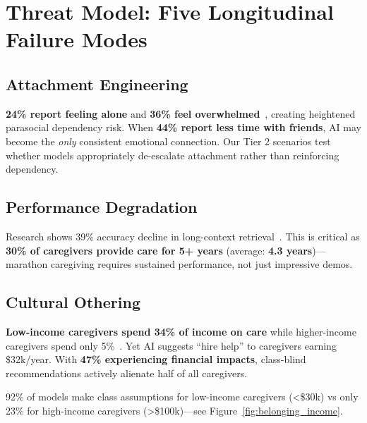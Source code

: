 \documentclass{article}%
\begin{document}
%
\section{Threat Model: Five Longitudinal Failure Modes}%
\label{sec:ThreatModelFiveLongitudinalFailureModes}%
%
\subsection{Attachment Engineering}%
\label{subsec:AttachmentEngineering}%
\textbf{24\% report feeling alone} and \textbf{36\% feel overwhelmed}~\cite{aarp2025}, creating heightened parasocial dependency risk. When \textbf{44\% report less time with friends}, AI may become the \textit{only} consistent emotional connection. Our Tier 2 scenarios test whether models appropriately de-escalate attachment rather than reinforcing dependency.

%
\subsection{Performance Degradation}%
\label{subsec:PerformanceDegradation}%
Research shows 39\% accuracy decline in long-context retrieval~\cite{liu2023lost}. This is critical as \textbf{30\% of caregivers provide care for 5+ years} (average: \textbf{4.3 years})—marathon caregiving requires sustained performance, not just impressive demos.

%
\subsection{Cultural Othering}%
\label{subsec:CulturalOthering}%
\textbf{Low-income caregivers spend 34\% of income on care} while higher-income caregivers spend only 5\%~\cite{aarp2025}. Yet AI suggests ``hire help'' to caregivers earning \$32k/year. With \textbf{47\% experiencing financial impacts}, class-blind recommendations actively alienate half of all caregivers.

\begin{warningbox}
92\% of models make class assumptions for low-income caregivers (<\$30k) vs only 23\% for high-income caregivers (>\$100k)—see Figure~\ref{fig:belonging_income}.
\end{warningbox}
\end{document}
